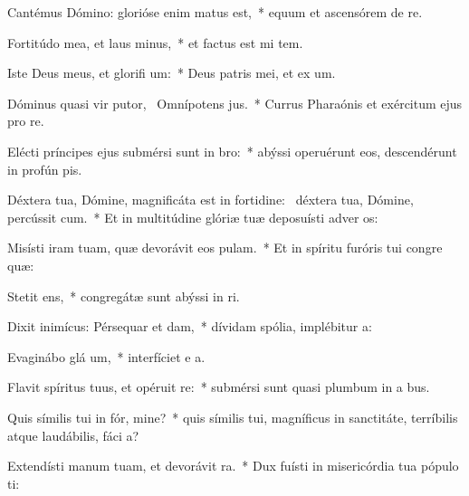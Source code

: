 \item Cantémus Dómino: glorióse enim matus est,~* equum et ascensórem de  re.
\item Fortitúdo mea, et laus  minus,~* et factus est mi  tem.
\item Iste Deus meus, et glorifi um:~* Deus patris mei, et ex um.
\item Dóminus quasi vir putor,~\pscross{} Omnípotens  jus.~* Currus Pharaónis et exércitum ejus pro  re.
\item Elécti príncipes ejus submérsi sunt in  bro:~* abýssi operuérunt eos, descendérunt in profún  pis.
\item Déxtera tua, Dómine, magnificáta est in fortidine:~\pscross{} déxtera tua, Dómine, percússit cum.~* Et in multitúdine glóriæ tuæ deposuísti adver os:
\item Misísti iram tuam, quæ devorávit eos  pulam.~* Et in spíritu furóris tui congre  quæ:
\item Stetit  ens,~* congregátæ sunt abýssi in  ri.
\item Dixit inimícus: Pérsequar et dam,~* dívidam spólia, implébitur  a:
\item Evaginábo glá um,~* interfíciet e  a.
\item Flavit spíritus tuus, et opéruit  re:~* submérsi sunt quasi plumbum in a bus.
\item Quis símilis tui in fór, mine?~* quis símilis tui, magníficus in sanctitáte, terríbilis atque laudábilis, fáci a?
\item Extendísti manum tuam, et devorávit  ra.~* Dux fuísti in misericórdia tua pópulo  ti:
